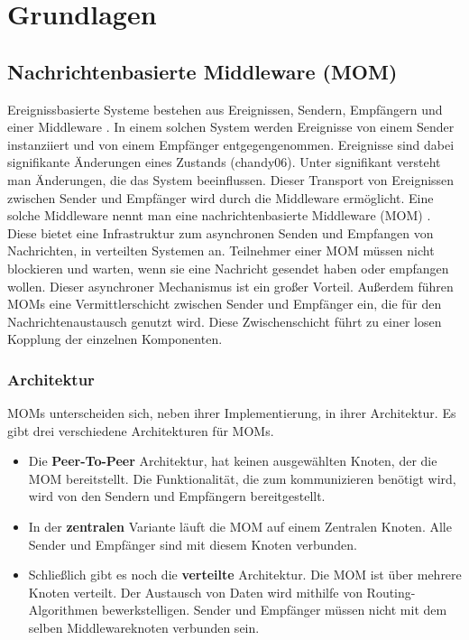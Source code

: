 
\chapter{Grundlagen}
\label{ch:Grundlagen}

\section{Nachrichtenbasierte Middleware (MOM)}
Ereignissbasierte Systeme bestehen aus Ereignissen, Sendern, Empfängern und einer Middleware \cite{Carzaniga1998}. In einem solchen System werden Ereignisse von einem Sender instanziiert und von einem Empfänger entgegengenommen. Ereignisse sind dabei signifikante Änderungen eines Zustands (chandy06). Unter signifikant versteht man Änderungen, die das System beeinflussen. Dieser Transport von Ereignissen zwischen Sender und Empfänger wird durch die Middleware ermöglicht. Eine solche Middleware nennt man eine nachrichtenbasierte Middleware (MOM) \cite{Curry05}. Diese bietet eine Infrastruktur zum asynchronen Senden und Empfangen von Nachrichten, in verteilten Systemen an. Teilnehmer einer MOM müssen nicht blockieren und warten, wenn sie eine Nachricht gesendet haben oder empfangen wollen. Dieser asynchroner Mechanismus ist ein großer Vorteil. Außerdem führen MOMs eine Vermittlerschicht zwischen Sender und Empfänger ein, die für den Nachrichtenaustausch genutzt wird. Diese Zwischenschicht führt zu einer losen Kopplung der einzelnen Komponenten.  \\

\subsection{Architektur}
MOMs unterscheiden sich, neben ihrer Implementierung, in ihrer Architektur. Es gibt drei verschiedene Architekturen für MOMs.
\begin{itemize}
\item Die \textbf{Peer-To-Peer} Architektur, hat keinen ausgewählten Knoten, der die MOM bereitstellt. Die Funktionalität, die zum kommunizieren benötigt wird, wird von den Sendern und Empfängern bereitgestellt.
\item In der \textbf{zentralen} Variante läuft die MOM auf einem Zentralen Knoten. Alle Sender und Empfänger sind mit diesem Knoten verbunden. 
\item Schließlich gibt es noch die \textbf{verteilte} Architektur. Die MOM ist über mehrere Knoten verteilt. Der Austausch von Daten wird mithilfe von Routing-Algorithmen bewerkstelligen. Sender und Empfänger müssen nicht mit dem selben Middlewareknoten verbunden sein.
\end{itemize}  

